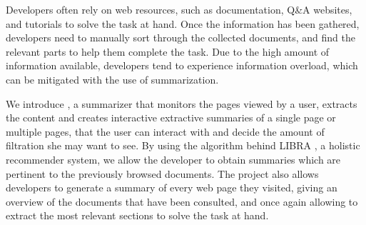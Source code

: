 \label{sec:abstract}
Developers often rely on web resources, such as documentation, Q\&A websites, and tutorials to solve the task at hand. Once the information has been gathered, developers need to manually sort through the collected documents, and find the relevant parts to help them complete the task. Due to the high amount of information available, developers tend to experience information overload, which can be mitigated with the use of summarization. 


We introduce \projectName, a summarizer that monitors the pages viewed by a user, extracts the content and creates interactive extractive summaries of a single page or multiple pages, that the user can interact with and decide the amount of filtration she may want to see. By using the algorithm behind LIBRA \cite{Ponz2017a}, a holistic recommender system, we allow the developer to obtain summaries which are pertinent to the previously browsed documents. The project also allows developers to generate a summary of every web page they visited, giving an overview of the documents that have been consulted, and once again allowing to extract the most relevant sections to solve the task at hand.
